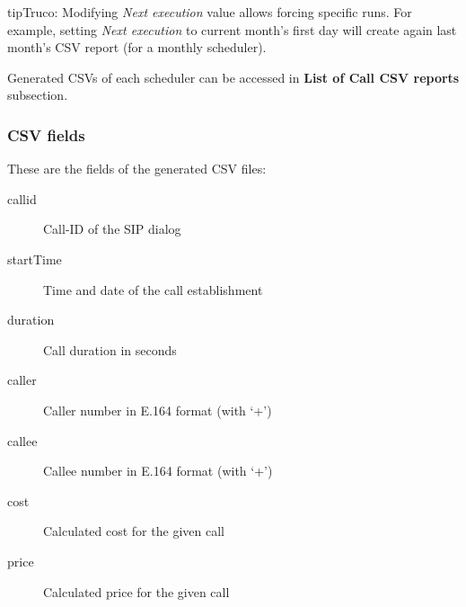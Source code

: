 \documentclass[letterpaper,10pt,spanish]{sphinxmanual}
\begin{document}
\begin{notice}{tip}{Truco:}
Modifying \emph{Next execution} value allows forcing specific runs. For example, setting \emph{Next execution} to
current month's first day will create again last month's CSV report (for a monthly scheduler).
\end{notice}

Generated CSVs of each scheduler can be accessed in \textbf{List of Call CSV reports} subsection.


\subsubsection{CSV fields}
\label{administration_portal/brand/calls/call_csv_schedulers:csv-fields}
These are the fields of the generated CSV files:
\begin{description}
\item[{callid}] \leavevmode{}\label{administration_portal/brand/calls/call_csv_schedulers:term-callid}
Call-ID of the SIP dialog

\item[{startTime}] \leavevmode{}\label{administration_portal/brand/calls/call_csv_schedulers:term-starttime}
Time and date of the call establishment

\item[{duration}] \leavevmode{}\label{administration_portal/brand/calls/call_csv_schedulers:term-duration}
Call duration in seconds

\item[{caller}] \leavevmode{}\label{administration_portal/brand/calls/call_csv_schedulers:term-caller}
Caller number in E.164 format (with `+')

\item[{callee}] \leavevmode{}\label{administration_portal/brand/calls/call_csv_schedulers:term-callee}
Callee number in E.164 format (with `+')

\item[{cost}] \leavevmode{}\label{administration_portal/brand/calls/call_csv_schedulers:term-cost}
Calculated cost for the given call

\item[{price}] \leavevmode{}\label{administration_portal/brand/calls/call_csv_schedulers:term-price}
Calculated price for the given call


\end{description}
\end{document}
